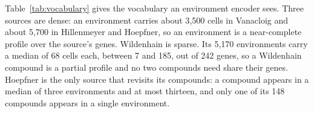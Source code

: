 
Table~\ref{tab:vocabulary} gives the vocabulary an environment encoder sees. Three sources
are dense: an environment carries about 3{,}500 cells in Vanacloig and about 5{,}700 in
Hillenmeyer and Hoepfner, so an environment is a near-complete profile over the source's
genes. Wildenhain is sparse. Its 5{,}170 environments carry a median of 68 cells each,
between 7 and 185, out of 242 genes, so a Wildenhain compound is a partial profile and no
two compounds need share their genes. Hoepfner is the only source that revisits its
compounds: a compound appears in a median of three environments and at most thirteen, and
only one of its 148 compounds appears in a single environment.

\begin{table}[htbp]
\centering
\footnotesize
\caption{Environments per source. Cells per environment is the minimum, median and
maximum. Doses and environments per compound are the median and the maximum over the
compounds dosed alone with an InChIKey.}
\label{tab:vocabulary}

\end{table}

